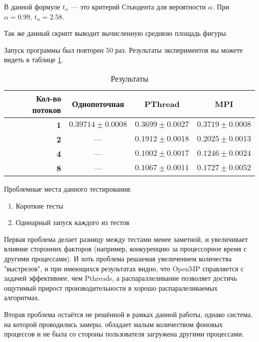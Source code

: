 В данной формуле $t_{\alpha}$ --- это критерий Стьюдента для вероятности $\alpha$. При $\alpha = 0.99$, $t_{\alpha} = 2.58$. 

Так же данный скрипт выводит вычисленную среднюю площадь фигуры.

Запуск программы был повторен 50 раз. Результаты экспериментов вы можете видеть в таблице \ref{tab:input1}.

\begin{table}[h!]
	\caption{Результаты}
	
	\center
	\begin{tabular}{|r|c|c|c|}
		\hline 
		\textbf{Кол-во потоков} & \textbf{Однопоточная} & \textbf{PThread} & \textbf{MPI} \\ 
		\hline 
		\textbf{1} & $0.39714 \pm 0.0008$ & $0.3699 \pm 0.0027$ & $0.3719 \pm 0.0008$ \\ 
		\hline 
		\textbf{2} & ---                  & $0.1912 \pm 0.0018$ & $0.2025 \pm 0.0013$ \\ 
		\hline 
		\textbf{4} & ---                  & \boldmath$0.1002 \pm 0.0017$ & $0.1246 \pm 0.0024$ \\ 
		\hline 
		\textbf{8} & ---                  & $0.1067 \pm 0.0011$ & $0.1727 \pm 0.0052$ \\ 
		\hline 
	\end{tabular} 
	
	\label{tab:input1}
\end{table}


Проблемные места данного тестирования:
\begin{enumerate}
\item Короткие тесты
\item Одинарный запуск каждого из тестов
\end{enumerate}

Первая проблема делает разницу между тестами менее заметной, и увеличивает влияние сторонних факторов (например, конкуренцию за процессорное время с другими процессами). И хоть проблема решаемая увеличением количества "выстрелов", и при имеющихся результатах видно, что OpenMP справляется с задачей эффективнее, чем Pthreads, а распараллеливание позволяет достичь ощутимый прирост производительности в хорошо распаралеливаемых алгоритмах.

Вторая проблема остаётся не решённой в рамках данной работы, однако система, на которой проводились замеры, обладает малым количеством фоновых процессов и не была со стороны пользователя загружена другими процессами.

